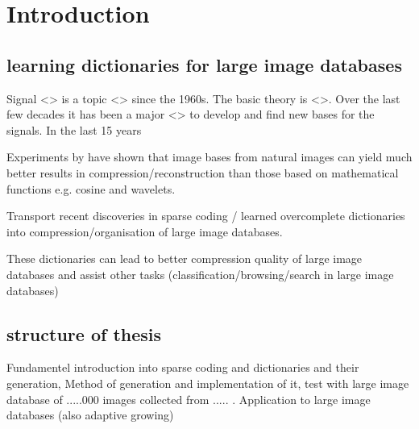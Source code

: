 \chapter{Introduction}
\label{sec:introduction}
\section{learning dictionaries for large image databases}
Signal <> is a topic <> since the 1960s. The basic theory is <>. Over the last few decades it has been
a major <> to develop and find new bases for the signals. In the last 15 years 


Experiments by \cite{} have shown \cite{} that image bases from natural images can yield much better results in compression/reconstruction than
those based on mathematical functions e.g. cosine and wavelets.


\cite{Mairal2010}

Transport recent discoveries in sparse coding / learned overcomplete dictionaries into compression/organisation
of large image databases.

These dictionaries can lead to better compression quality of large image databases and assist other tasks (classification/browsing/search in large image databases)

\section{structure of thesis}
Fundamentel introduction into sparse coding and dictionaries and their generation,
Method of generation and implementation of it, test with large image database of .....000 images collected from ..... .
Application to large image databases (also adaptive growing) 


